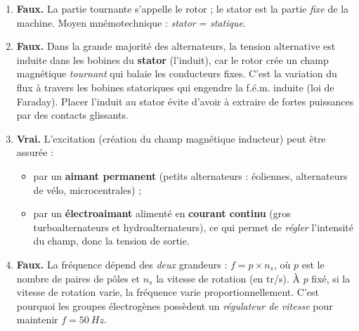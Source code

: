 \documentclass[11pt]{article}
\newcommand{\cle}[1]{{\popxbold\color{popdark}#1}}
\begin{document}
\begin{corrige}
\begin{enumerate}
\item \textbf{Faux.} La partie tournante s'appelle le \cle{rotor} ; le \cle{stator} est la partie \emph{fixe} de la machine. Moyen mnémotechnique : \emph{stator} = \emph{statique}.
\item \textbf{Faux.} Dans la grande majorité des alternateurs, la tension alternative est induite dans les bobines du \textbf{stator} (l'induit), car le rotor crée un champ magnétique \emph{tournant} qui balaie les conducteurs fixes. C'est la variation du flux à travers les bobines statoriques qui engendre la f.é.m. induite (loi de Faraday). Placer l'induit au stator évite d'avoir à extraire de fortes puissances par des contacts glissants.
\item \textbf{Vrai.} L'\cle{excitation} (création du champ magnétique inducteur) peut être assurée :
\begin{itemize}
\item par un \textbf{aimant permanent} (petits alternateurs : éoliennes, alternateurs de vélo, microcentrales) ;
\item par un \textbf{électroaimant} alimenté en \textbf{courant continu} (gros turboalternateurs et hydroalternateurs), ce qui permet de \emph{régler} l'intensité du champ, donc la tension de sortie.
\end{itemize}
\item \textbf{Faux.} La fréquence dépend des \emph{deux} grandeurs : $f = p \times n_s$, où $p$ est le nombre de paires de pôles et $n_s$ la vitesse de rotation (en tr/s). À $p$ fixé, si la vitesse de rotation varie, la fréquence varie proportionnellement. C'est pourquoi les groupes électrogènes possèdent un \emph{régulateur de vitesse} pour maintenir $f = \SI{50}{Hz}$.
\end{enumerate}
\end{corrige}
\end{document}
